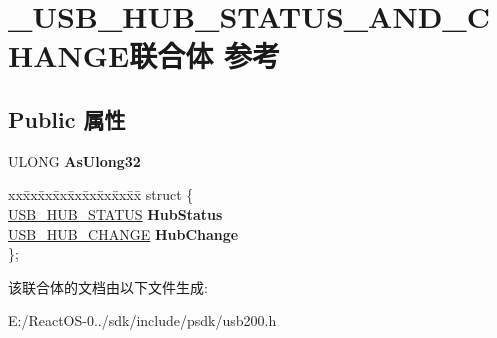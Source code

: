 \hypertarget{union___u_s_b___h_u_b___s_t_a_t_u_s___a_n_d___c_h_a_n_g_e}{}\section{\+\_\+\+U\+S\+B\+\_\+\+H\+U\+B\+\_\+\+S\+T\+A\+T\+U\+S\+\_\+\+A\+N\+D\+\_\+\+C\+H\+A\+N\+G\+E联合体 参考}
\label{union___u_s_b___h_u_b___s_t_a_t_u_s___a_n_d___c_h_a_n_g_e}
\subsection*{Public 属性}
\begin{DoxyCompactItemize}
\item 
\mbox{\label{union___u_s_b___h_u_b___s_t_a_t_u_s___a_n_d___c_h_a_n_g_e_a320ec10b6bba35127d6ce17adfb7cdac}} 
U\+L\+O\+NG {\bfseries As\+Ulong32}
\item 
\mbox{\label{union___u_s_b___h_u_b___s_t_a_t_u_s___a_n_d___c_h_a_n_g_e_a70a507957ac3d42bf773e17151c7bdf7}} 
\begin{tabbing}
xx\=xx\=xx\=xx\=xx\=xx\=xx\=xx\=xx\=\kill
struct \{\\
\>\hyperlink{union___u_s_b___h_u_b___s_t_a_t_u_s}{USB\_HUB\_STATUS} {\bfseries HubStatus}\\
\>\hyperlink{union___u_s_b___h_u_b___c_h_a_n_g_e}{USB\_HUB\_CHANGE} {\bfseries HubChange}\\
\}; \\

\end{tabbing}\end{DoxyCompactItemize}


该联合体的文档由以下文件生成\+:\begin{DoxyCompactItemize}
\item 
E\+:/\+React\+O\+S-\/0../sdk/include/psdk/usb200.\+h\end{DoxyCompactItemize}
